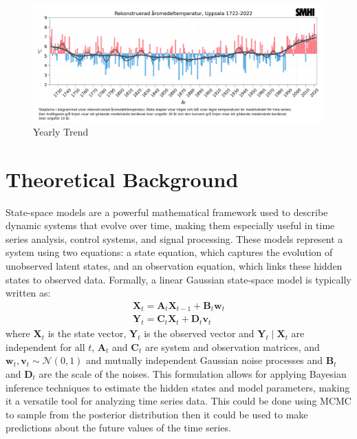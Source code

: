 \documentclass{IEEEtran}
\begin{document}
    \begin{figure}[h!]
      \centering
      \captionsetup{justification=centering}
      \includegraphics[width=\linewidth]{./data_trend.png}
      \caption{Yearly Trend}
      \label{fig:Trend}
    \end{figure}

    \section{Theoretical Background}
    State-space models are a powerful mathematical framework used to describe dynamic systems that evolve over time, making them especially useful in time series analysis, control systems, and signal processing. These models represent a system using two equations: a state equation, which captures the evolution of unobserved latent states, and an observation equation, which links these hidden states to observed data. Formally, a linear Gaussian state-space model is typically written as:
    \begin{gather}
      \mathbf{X}_t = \mathbf{A}_t \mathbf{X}_{t-1} + \mathbf{B}_t\mathbf{w}_t \\
      \mathbf{Y}_t = \mathbf{C}_t \mathbf{X}_t + \mathbf{D}_t\mathbf{v}_t
    \end{gather}
    where $\mathbf{X}_t$ is the state vector, $\mathbf{Y}_t$ is the observed vector and \(\mathbf{Y}_t \mid \mathbf{X}_t\) are independent for all $t$, $\mathbf{A}_t$ and $\mathbf{C}_t$ are system and observation matrices, and $\mathbf{w}_t , \mathbf{v}_t \sim \mathcal{N}(0, 1)$ and mutually independent Gaussian noise processes and $\mathbf{B}_t$ and $\mathbf{D}_t$ are the scale of the noises. This formulation allows for applying Bayesian inference techniques to estimate the hidden states and model parameters, making it a versatile tool for analyzing time series data. This could be done using MCMC to sample from the posterior distribution then it could be used to make predictions about the future values of the time series.
\end{document}
